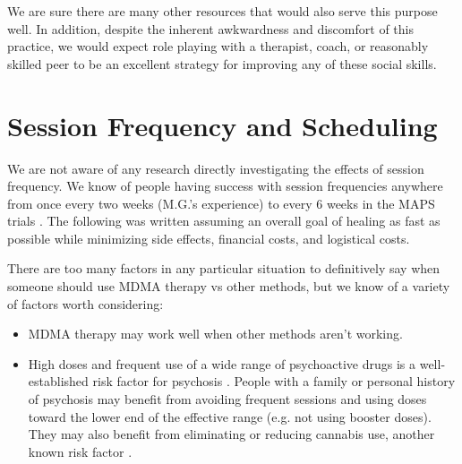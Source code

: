 \documentclass[12pt,letterpaper]{book}
\begin{document}
We are sure there are many other resources that would also serve this purpose well. In addition, despite the inherent awkwardness and discomfort of this practice, we would expect role playing with a therapist, coach, or reasonably skilled peer to be an excellent strategy for improving any of these social skills.
\section{Session Frequency and Scheduling}
\label{frequency}
We are not aware of any research directly investigating the effects of session frequency. We know of people having success with session frequencies anywhere from once every two weeks (M.G.'s experience) to every 6 weeks in the MAPS trials \cite{mitchellMDMAClinicalTrial,mitchellMDMAClinicalTrial2}. The following was written assuming an overall goal of healing as fast as possible while minimizing side effects, financial costs, and logistical costs.

There are too many factors in any particular situation to definitively say when someone should use MDMA therapy vs other methods, but we know of a variety of factors worth considering:
\begin{itemize}
    \item MDMA therapy may work well when other methods aren't working.
    \item High doses and frequent use of a wide range of psychoactive drugs is a well-established risk factor for psychosis \cite{drugsPsychosis}. People with a family or personal history of psychosis may benefit from avoiding frequent sessions and using doses toward the lower end of the effective range (e.g. not using booster doses). They may also benefit from eliminating or reducing cannabis use, another known risk factor \cite{drugsPsychosis}.
\end{itemize}
\end{document}
